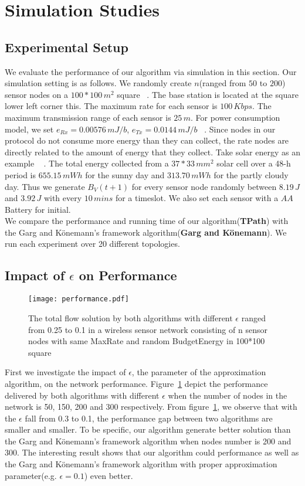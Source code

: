 \documentclass{article}
\begin{document}
\section{Simulation Studies}
\subsection{Experimental Setup}
We evaluate the performance of our algorithm via simulation in this section.
Our simulation setting is as follows. We randomly create $n$(ranged from $50$ to $200$) sensor nodes
on a $100*100\,m^2$ square ~\cite{Maxi}. The base station is located at the square lower left corner this. The maximum rate for each sensor is $100\,Kbps$. The maximum transmission range of each sensor is $25\,m$. For power consumption model, we set $e_{Rx} = 0.00576\,mJ/b$, $e_{Tx} = 0.0144\,mJ/b$ ~\cite{Ene}. Since nodes in our protocol do not
consume more energy than they can collect, the rate nodes are directly related to the amount of energy that they collect. Take solar energy as an example ~\cite{Ste} . The total energy collected from a $37 * 33\,mm^2$ solar cell over a 48-h period is $655.15\,mWh$ for the sunny day and $313.70\,mWh$ for the partly cloudy day. Thus we generate $B_V(t+1)$ for every sensor node randomly between $8.19\,J$ and $3.92\,J$ with every $10\,mins$ for a timeslot. We also set each sensor with a $AA$ Battery for initial.\\
We compare the performance and running time of our algorithm(\textbf{TPath}) with the Garg and K\"{o}nemann's framework algorithm(\textbf{Garg and K\"{o}nemann}). We run each experiment over 20 different topologies.

\subsection{Impact of $\epsilon$ on Performance}
\begin{figure}[htbp]
\centering
\texttt{[image: performance.pdf]}
\caption{The total flow solution by both algorithms with different $\epsilon$ ranged from 0.25 to 0.1 in a wireless sensor network consisting of n sensor nodes with same MaxRate and random BudgetEnergy in 100*100 square}
\label{fig:performance}
\end{figure}

First we investigate the impact of $\epsilon$, the parameter of the approximation algorithm, on the network performance. Figure~\ref{fig:performance} depict the performance delivered by both algorithms with different $\epsilon$ when the number of nodes in the network is 50, 150, 200 and 300 respectively. From figure~\ref{fig:performance}, we observe that with the $\epsilon$ fall from 0.3 to 0.1, the performance gap between two algorithms are smaller and smaller. To be specific, our algorithm generate better solution than the Garg and K\"{o}nemann's framework algorithm when nodes number is 200 and 300. The interesting result shows that our algorithm could performance as well as the Garg and K\"{o}nemann's framework algorithm with proper approximation parameter(e.g. $\epsilon = 0.1$) even better.
\end{document}
